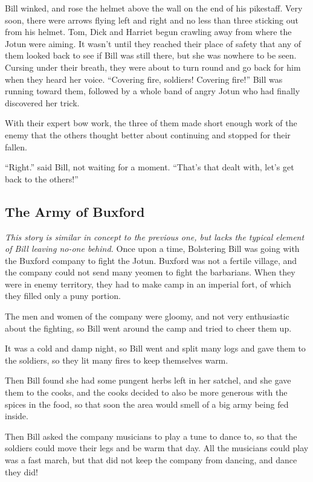Bill winked, and rose the helmet above the wall on the end of his pikestaff. Very soon, there were arrows flying left and right and no less than three sticking out from his helmet. Tom, Dick and Harriet begun crawling away from where the Jotun were aiming. It wasn't until they reached their place of safety that any of them looked back to see if Bill was still there, but she was nowhere to be seen. Cursing under their breath, they were about to turn round and go back for him when they heard her voice. “Covering fire, soldiers! Covering fire!” Bill was running toward them, followed by a whole band of angry Jotun who had finally discovered her trick.

With their expert bow work, the three of them made short enough work of the enemy that the others thought better about continuing and stopped for their fallen.

“Right.” said Bill, not waiting for a moment. “That's that dealt with, let's get back to the others!” 
\subsection{The Army of Buxford}
\textit{This story is similar in concept to the previous one, but lacks the typical element of Bill leaving no-one behind.}
Once upon a time, Bolstering Bill was going with the Buxford company to fight the Jotun. Buxford was not a fertile village, and the company could not send many yeomen to fight the barbarians. When they were in enemy territory, they had to make camp in an imperial fort, of which they filled only a puny portion.

The men and women of the company were gloomy, and not very enthusiastic about the fighting, so Bill went around the camp and tried to cheer them up. 

It was a cold and damp night, so Bill went and split many logs and gave them to the soldiers, so they lit many fires to keep themselves warm.

Then Bill found she had some pungent herbs left in her satchel, and she gave them to the cooks, and the cooks decided to also be more generous with the spices in the food, so that soon the area would smell of a big army being fed inside.

Then Bill asked the company musicians to play a tune to dance to, so that the soldiers could move their legs and be warm that day. All the musicians could play was a fast march, but that did not keep the company from dancing, and dance they did!

